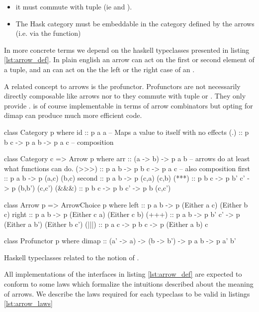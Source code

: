 \begin{itemize}
\item it must commute with tuple (ie  and ).
\item The Hask category must be embeddable in the category defined by the
arrows (i.e. via the  function)
\end{itemize}

In more concrete terms we depend on the haskell typeclasses presented
in listing \ref{lst:arrow_def}. In plain english an arrow can act on
the first or second element of a tuple, and an  can
act on the the left or the right case of an .

A related concept to arrows is the profunctor. Profunctors are not
necessarily directly composable like arrows nor to they commute with
tuple or . They only provide . 
is of course implementable in terms of arrow combinators but opting
for dimap can produce much more efficient code.


\begin{code}
\begin{haskellcode}
class Category p where
  id :: p a a -- Maps a value to itself with no effects
  (.) :: p b c -> p a b -> p a c -- composition

class Category c => Arrow p where
  arr :: (a -> b) -> p a b -- arrows do at least what functions can do.
  (>>>) :: p a b -> p b c -> p a c -- also composition
  first :: p a b -> p (a,c) (b,c)
  second :: p a b -> p (c,a) (c,b)
  (***) :: p b c -> p b' c' -> p (b,b') (c,c')
  (&&&) :: p b c -> p b c' -> p b (c,c')

class Arrow p => ArrowChoice p where
  left :: p a b -> p (Either a c) (Either b c)
  right :: p a b -> p (Either c a) (Either c b)
  (+++) :: p a b -> p b' c' -> p (Either a b') (Either b c')
  (|||) :: p a c -> p b c -> p (Either a b) c

class Profunctor p where
  dimap :: (a' -> a) -> (b -> b') -> p a b -> p a' b'
\end{haskellcode}
  \caption{\label{lst:arrow_def}Haskell typeclasses related to the
    notion of .}
\end{code}


All implementations of the interfaces in listing \ref{lst:arrow_def}
are expected to conform to some laws which formalize the intuitions
described about the meaning of arrows. We describe the laws required
for each typeclass to be valid in listings \ref{lst:arrow_laws}

